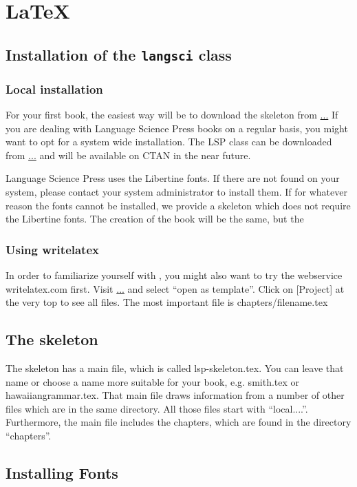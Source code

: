 \chapter{\LaTeX}

\section{Installation of the \texttt{langsci} class}
\subsection{Local installation}
For your first book, the easiest way will be to download the skeleton from \url{...} %
If you are dealing with Language Science Press books on a regular basis, you might want to opt for a system wide installation. The LSP class can be downloaded from \url{...} and will be available on CTAN in the near future.

Language Science Press uses the Libertine fonts. If there are not found on your system, please contact your system administrator to install them. If for whatever reason the fonts cannot be installed, we provide a skeleton which does not require the Libertine fonts. The creation of the book will be the same, but the 

\subsection{Using writelatex}
In order to familiarize yourself with \latex, you might also want to try the webservice writelatex.com first. Visit \url{...} and select ``open as template''. Click on [Project] at the very top to see all files. The most important file is chapters/filename.tex

\section{The skeleton}
The skeleton has a main file, which is called lsp-skeleton.tex. You can leave that name or choose a name more suitable for your book, e.g. smith.tex or hawaiiangrammar.tex. That main file draws information from a number of other files which are in the same directory. All those files start with ``local....''. Furthermore, the main file includes the chapters, which are found in the directory ``chapters''.


\section{Installing Fonts}



